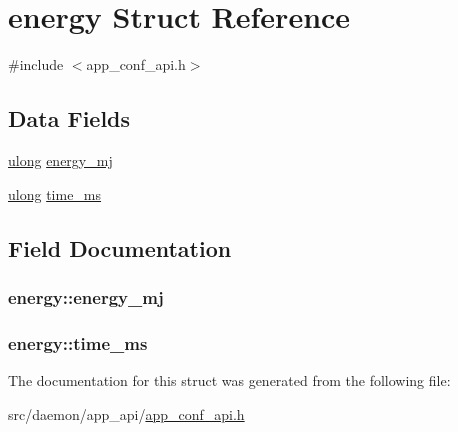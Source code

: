 \hypertarget{structenergy}{}\section{energy Struct Reference}
\label{structenergy}


{\ttfamily \#include $<$app\+\_\+conf\+\_\+api.\+h$>$}

\subsection*{Data Fields}
\begin{DoxyCompactItemize}
\item 
\hyperlink{generic_8h_a718b4eb2652c286f4d42dc18a8e71a1a}{ulong} \hyperlink{structenergy_a70418de058989ae0aadcd43a6f716094}{energy\+\_\+mj}
\item 
\hyperlink{generic_8h_a718b4eb2652c286f4d42dc18a8e71a1a}{ulong} \hyperlink{structenergy_a8010e0b453175a5b89d7e8b95bf4d7c2}{time\+\_\+ms}
\end{DoxyCompactItemize}


\subsection{Field Documentation}
\subsubsection[{\texorpdfstring{energy\+\_\+mj}{energy_mj}}]{ energy\+::energy\+\_\+mj}\hypertarget{structenergy_a70418de058989ae0aadcd43a6f716094}{}\label{structenergy_a70418de058989ae0aadcd43a6f716094}
\subsubsection[{\texorpdfstring{time\+\_\+ms}{time_ms}}]{ energy\+::time\+\_\+ms}\hypertarget{structenergy_a8010e0b453175a5b89d7e8b95bf4d7c2}{}\label{structenergy_a8010e0b453175a5b89d7e8b95bf4d7c2}


The documentation for this struct was generated from the following file\+:\begin{DoxyCompactItemize}
\item 
src/daemon/app\+\_\+api/\hyperlink{app__conf__api_8h}{app\+\_\+conf\+\_\+api.\+h}\end{DoxyCompactItemize}
